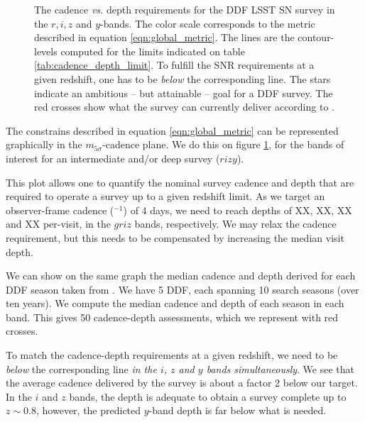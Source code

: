\documentclass[\docopts]{\docclass}
\begin{document}
\begin{figure}[t]
\begin{center}
\caption{The cadence {\em vs.} depth requirements for the DDF LSST SN
  survey in the $r,i,z$ and $y$-bands. The color scale corresponds to
  the metric described in equation \ref{eqn:global_metric}.  The lines are
  the contour-levels computed for the limits indicated on table
  \ref{tab:cadence_depth_limit}. To fulfill the SNR requirements at a
  given redshift, one has to be {\em below} the corresponding
  line. The stars indicate an ambitious -- but attainable -- goal for
  a DDF survey.  The red crosses show what the survey can currently
  deliver according to . }
\label{fig:m5_cadence_limits_ddf}
\end{center}
\end{figure}

The constrains described in equation \ref{eqn:global_metric} can be
represented graphically in the $m_{5\sigma}$-cadence plane. We do this
on figure \ref{fig:m5_cadence_limits_ddf}, for the bands of interest
for an intermediate and/or deep survey ($rizy$). 

This plot allows one to quantify the nominal survey cadence and depth
that are required to operate a survey up to a given redshift limit.
As we target an observer-frame cadence ($^{-1}$) of 4 days, we need to
reach depths of XX, XX, XX and XX per-visit, in the $griz$ bands,
respectively. We may relax the cadence requirement, but this needs to
be compensated by increasing the median visit depth.

We can show on the same graph the median cadence and depth derived for
each DDF season taken from . We have 5 DDF, each
spanning 10 search seasons (over ten years). We compute the median
cadence and depth of each season in each band. This gives 50
cadence-depth assessments, which we represent with red crosses.

To match the cadence-depth requirements at a given redshift, we need
to be {\em below} the corresponding line {\em in the $i$, $z$ and $y$
  bands simultaneously}. We see that the average cadence delivered by
the survey is about a factor 2 below our target. In the $i$ and $z$
bands, the depth is adequate to obtain a survey complete up to $z \sim
0.8$, however, the predicted $y$-band depth is far below what is
needed.
\end{document}

